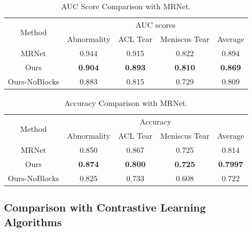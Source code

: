 \documentclass[journal]{IEEEtai}
\begin{document}
\begin{table}[ht]
    \centering
    \bgroup
    \caption{AUC Score Comparison with MRNet. }
    \def\arraystretch{1.5}
    \begin{tabular}{c|c|c|c|c}
    \hline
        \multirow{2}{1.2cm}{\centering Method} & \multicolumn{4}{c}{\centering AUC scores}\\ \cline{2-5}
        {} & Abnormality & ACL Tear & Meniscus Tear & Average\\  
        \hline \hline
        MRNet \cite{mrnet} & 0.944 & 0.915 & 0.822 & 0.894\\ \hline
Ours & \textbf{0.904} & \textbf{0.893} & \textbf{0.810} & \textbf{0.869}\\ \hline
        Ours-NoBlocks & 0.883 & 0.815 & 0.729 & 0.809 \\ \hline
         
    \end{tabular}
    \label{tab:super_comp_auc}
    \egroup
\end{table}

\begin{table}[ht]
    \centering
    \bgroup
    \caption{Accuracy Comparison with MRNet. }
    \def\arraystretch{1.5}
    \begin{tabular}{c|c|c|c|c}
    \hline
        \multirow{2}{1.2cm}{\centering Method} & \multicolumn{4}{c}{\centering Accuracy}\\ \cline{2-5}
        {} & Abnormality & ACL Tear & Meniscus Tear & Average\\  
        \hline \hline
        MRNet \cite{mrnet} & 0.850 & 0.867 & 0.725 & 0.814\\ \hline
Ours & \textbf{0.874} & \textbf{0.800} & \textbf{0.725} & \textbf{0.7997}\\ \hline
        Ours-NoBlocks & 0.825 & 0.733 & 0.608 & 0.722\\ \hline
         
    \end{tabular}
    \label{tab:super_comp_acc}
    
    \egroup
\end{table}


\subsection{Comparison with Contrastive Learning Algorithms}
\label{subsec:com_contr_algo}
\end{document}
